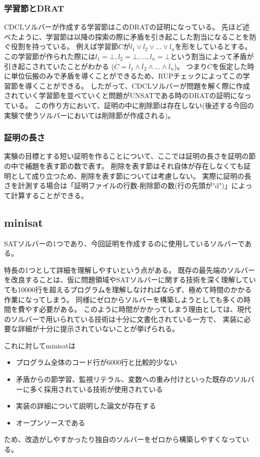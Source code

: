 \documentclass[titlepage]{jsarticle}
\begin{document}
\subsubsection{学習節とDRAT}
CDCLソルバーが作成する学習節はこのDRATの証明になっている。
先ほど述べたように、学習節は以降の探索の際に矛盾を引き起こした割当になることを防ぐ役割を持っている。
例えば学習節$C$が$l_1 \lor l_2 \lor ... \lor l_n$を形をしているとする。
この学習節が作られた際には$l_1=\bot, l_2=\bot, ... , l_n=\bot$という割当によって矛盾が引き起こされていたことがわかる
($\overline C = \overline l_1 \land \overline l_2 \land ... \land \overline l_n$)。
つまり$\overline C$を仮定した時に単位伝搬のみで矛盾を導くことができるため、RUPチェックによってこの学習節を導くことができる。
したがって、CDCLソルバーが問題を解く際に作成されていく学習節を並べていくと問題がUNSATである時のDRATの証明になっている。
この作り方において、証明の中に削除節は存在しない(後述する今回の実験で使うソルバーにおいては削除節が作成される)。



\subsubsection{証明の長さ}
実験の目標とする短い証明を作ることについて、ここでは証明の長さを証明の節の中で補題を表す節の数で表す。
削除を表す節はそれ自体が存在しなくても証明として成り立つため、削除を表す節については考慮しない。
実際に証明の長さを計測する場合は「証明ファイルの行数-削除節の数(行の先頭が"d")」によって計算することができる。





\subsection{minisat}



SATソルバーの1つであり、今回証明を作成するのに使用しているソルバーである。

特長の1つとして詳細を理解しやすいという点がある。
既存の最先端のソルバーを改良することは、仮に問題領域やSATソルバーに関する技術を深く理解していても10000行を超えるプログラムを理解しなければならず、極めて時間のかかる作業になってしまう。
同様にゼロからソルバーを構築しようとしても多くの時間を費やす必要がある。
このように時間がかかってしまう理由としては、現代のソルバーで用いられている技術は十分に文書化されている一方で、
実装に必要な詳細が十分に提示されていないことが挙げられる。

これに対してminisatは
\begin{itemize}
	\item プログラム全体のコード行が6000行と比較的少ない
	\item 矛盾からの節学習、監視リテラル、変数への重み付けといった既存のソルバーに多く採用されている技術が使用されている
	\item 実装の詳細について説明した論文が存在する
	\item オープンソースである
\end{itemize}
ため、改造がしやすかったり独自のソルバーをゼロから構築しやすくなっている。
\end{document}
